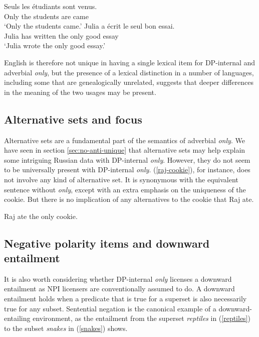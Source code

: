 \begin{exe}
	\ex \gll Seuls les \'{e}tudiants sont venus.\\
	Only the students are came\\
	\glt `Only the students came.'
	\ex \gll Julia a \'{e}crit le seul bon essai.\\
	Julia has written the only good essay\\
	\glt `Julia wrote the only good essay.'
\end{exe}

English is therefore not unique in having a single lexical item for DP-internal and adverbial \textit{only}, but the presence of a lexical distinction in a number of languages, including some that are genealogically unrelated, suggests that deeper differences in the meaning of the two usages may be present.

\subsection{Alternative sets and focus}
Alternative sets are a fundamental part of the semantics of adverbial \textit{only}. We have seen in section \ref{sec:no-anti-unique} that alternative sets may help explain some intriguing Russian data with DP-internal \textit{only}. However, they do not seem to be universally present with DP-internal \textit{only}. (\ref{raj-cookie}), for instance, does not involve any kind of alternative set. It is synonymous with the equivalent sentence without \textit{only}, except with an extra emphasis on the uniqueness of the cookie. But there is no implication of any alternatives to the cookie that Raj ate.

\begin{exe}
	\ex \label{raj-cookie} Raj ate the only cookie.
\end{exe}


\subsection{Negative polarity items and downward entailment}
It is also worth considering whether DP-internal \textit{only} licenses a downward entailment as NPI licensers are conventionally assumed to do. A downward entailment holds when a predicate that is true for a superset is also necessarily true for any subset. Sentential negation is the canonical example of a downward-entailing environment, as the entailment from the superset \textit{reptiles} in (\ref{reptiles}) to the subset \textit{snakes} in (\ref{snakes}) shows.

